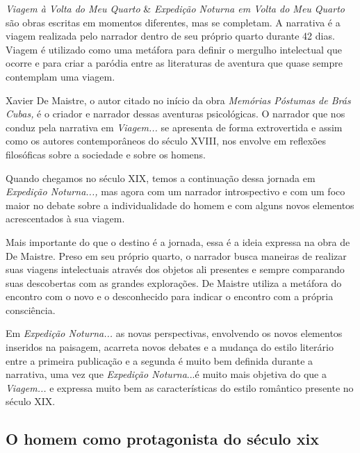 \documentclass[12pt]{extarticle}
\begin{document}


\emph{Viagem à Volta do Meu Quarto} \& \emph{Expedição Noturna em Volta
do Meu Quarto} são obras escritas em momentos diferentes, mas se
completam. A narrativa é a viagem realizada pelo narrador dentro de seu
próprio quarto durante 42 dias. Viagem é utilizado como uma metáfora
para definir o mergulho intelectual que ocorre e para criar a paródia
entre as literaturas de aventura que quase sempre contemplam uma viagem.

Xavier De Maistre, o autor citado no início da obra \emph{Memórias
Póstumas de Brás Cubas,} é o criador e narrador dessas aventuras
psicológicas. O narrador que nos conduz pela narrativa em
\emph{Viagem...} se apresenta de forma extrovertida e assim como os
autores contemporâneos do século XVIII, nos envolve em reflexões
filosóficas sobre a sociedade e sobre os homens.




Quando chegamos no século XIX, temos a continuação dessa jornada em
\emph{Expedição Noturna...,} mas agora com um narrador introspectivo e
com um foco maior no debate sobre a individualidade do homem e com
alguns novos elementos acrescentados à sua viagem.

Mais importante do que o destino é a jornada, essa é a ideia expressa na
obra de De Maistre. Preso em seu próprio quarto, o narrador busca
maneiras de realizar suas viagens intelectuais através dos objetos ali
presentes e sempre comparando suas descobertas com as grandes
explorações. De Maistre utiliza a metáfora do encontro com o novo e o
desconhecido para indicar o encontro com a própria consciência.




Em \emph{Expedição Noturna...} as novas perspectivas, envolvendo os
novos elementos inseridos na paisagem, acarreta novos debates e a
mudança do estilo literário entre a primeira publicação e a segunda é
muito bem definida durante a narrativa, uma vez que \emph{Expedição
Noturna}...é muito mais objetiva do que a \emph{Viagem...} e expressa
muito bem as características do estilo romântico presente no século XIX.

\subsection{O homem como protagonista do século xix}
\end{document}
